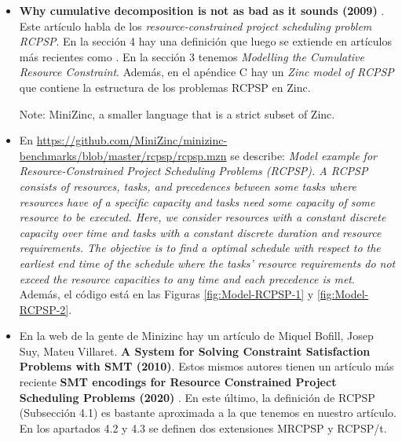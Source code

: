 \begin{itemize}
    \item \textbf{Why cumulative decomposition is not as bad as it sounds (2009)} \cite{schutt2009cumulative}. Este artículo  habla de los \textit{resource-constrained project scheduling problem RCPSP}. En la sección 4 hay una definición que luego se extiende en artículos más recientes como \cite{BOFILL2020106777}. 
    En la sección 3 tenemos \textit{Modelling the Cumulative Resource Constraint}.
    Además, en el apéndice C hay un \textit{Zinc model of RCPSP} que contiene la estructura de los problemas RCPSP en Zinc. 

    Note: MiniZinc, a smaller language that is a strict subset of Zinc.
    
    \item En \url{https://github.com/MiniZinc/minizinc-benchmarks/blob/master/rcpsp/rcpsp.mzn} se describe:
    \textit{Model example for Resource-Constrained Project Scheduling Problems (RCPSP).
 A RCPSP consists of resources, tasks, and precedences between some tasks where resources have of a specific capacity and tasks need some capacity of some resource to be executed.
 Here, we consider resources with a constant discrete capacity over time and tasks with a constant discrete duration and resource requirements.
 The objective is to find a optimal schedule with respect to the earliest end time of the schedule where the tasks' resource requirements do not exceed the resource capacities to any time and each precedence is met}. Además, el código está en las Figuras \ref{fig:Model-RCPSP-1} y \ref{fig:Model-RCPSP-2}. 


    

    \item En la web de la gente de Minizinc hay un artículo de Miquel Bofill, Josep Suy, Mateu Villaret. \textbf{A System for Solving Constraint Satisfaction Problems with SMT (2010)}.
    Estos mismos autores tienen un artículo más reciente \textbf{SMT encodings for Resource Constrained Project Scheduling Problems (2020)} 
\cite{BOFILL2020106777}. En este último,  
la definición de RCPSP (Subsección 4.1) es bastante aproximada a la que tenemos en nuestro artículo. En los apartados 4.2 y 4.3 se definen dos extensiones MRCPSP y RCPSP/t.
\end{itemize}



